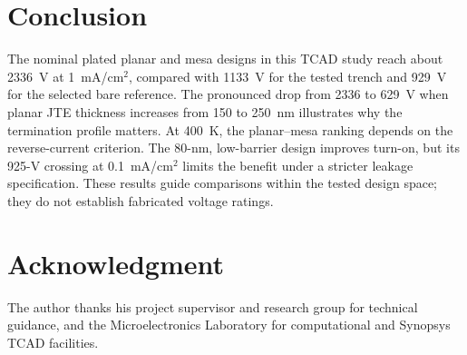 \documentclass[journal,10pt]{IEEEtran}
\begin{document}
\section{Conclusion}
The nominal plated planar and mesa designs in this TCAD study reach about 2336~V at 1~mA/cm$^2$, compared with 1133~V for the tested trench and 929~V for the selected bare reference. The pronounced drop from 2336 to 629~V when planar JTE thickness increases from 150 to 250~nm illustrates why the termination profile matters. At 400~K, the planar--mesa ranking depends on the reverse-current criterion. The 80-nm, low-barrier design improves turn-on, but its 925-V crossing at 0.1~mA/cm$^2$ limits the benefit under a stricter leakage specification. These results guide comparisons within the tested design space; they do not establish fabricated voltage ratings.

\section*{Acknowledgment}
The author thanks his project supervisor and research group for technical guidance, and the Microelectronics Laboratory for computational and Synopsys TCAD facilities.



\end{document}
